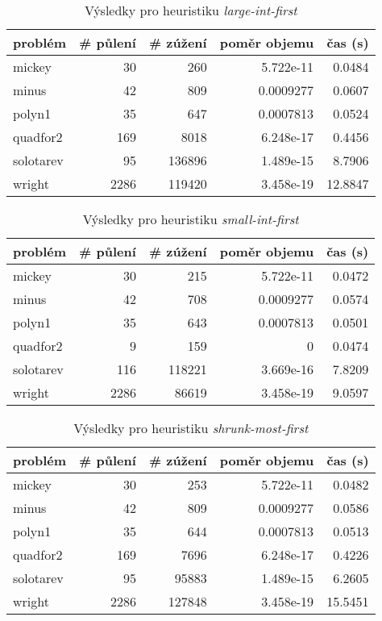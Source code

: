 {\begin{table}[H]
\centering
\begin{tabular}{lrrrr}
\hline
problém & \# půlení & \# zúžení & poměr objemu & čas (s) \\ \hline
mickey & 30 & 260 & 5.722e-11 & 0.0484 \\
minus & 42 & 809 & 0.0009277 & 0.0607 \\
polyn1 & 35 & 647 & 0.0007813 & 0.0524 \\
quadfor2 & 169 & 8018 & 6.248e-17 & 0.4456 \\
solotarev & 95 & 136896 & 1.489e-15 & 8.7906 \\
wright & 2286 & 119420 & 3.458e-19 & 12.8847 \\
\end{tabular}
\caption{Výsledky pro heuristiku \emph{large-int-first}}
\label{large-int-first}
\end{table}



\begin{table}[H]
\centering
\begin{tabular}{lrrrr}
\hline
problém & \# půlení & \# zúžení & poměr objemu & čas (s) \\ \hline
mickey & 30 & 215 & 5.722e-11 & 0.0472 \\
minus & 42 & 708 & 0.0009277 & 0.0574 \\
polyn1 & 35 & 643 & 0.0007813 & 0.0501 \\
quadfor2 & 9 & 159 & 0 & 0.0474 \\
solotarev & 116 & 118221 & 3.669e-16 & 7.8209 \\
wright & 2286 & 86619 & 3.458e-19 & 9.0597 \\
\end{tabular}
\caption{Výsledky pro heuristiku \emph{small-int-first}}
\label{small-int-first}
\end{table}



\begin{table}[H]
\centering
\begin{tabular}{lrrrr}
\hline
problém & \# půlení & \# zúžení & poměr objemu & čas (s) \\ \hline
mickey & 30 & 253 & 5.722e-11 & 0.0482 \\
minus & 42 & 809 & 0.0009277 & 0.0586 \\
polyn1 & 35 & 644 & 0.0007813 & 0.0513 \\
quadfor2 & 169 & 7696 & 6.248e-17 & 0.4226 \\
solotarev & 95 & 95883 & 1.489e-15 & 6.2605 \\
wright & 2286 & 127848 & 3.458e-19 & 15.5451 \\
\end{tabular}
\caption{Výsledky pro heuristiku \emph{shrunk-most-first}}
\label{shrunk-most-first}
\end{table}



}
